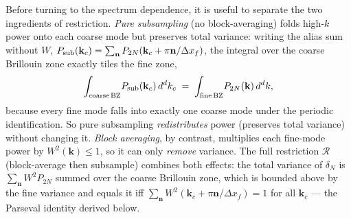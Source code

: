 \documentclass[12pt]{article}
\newcommand{\R}{\mathcal{R}}
\begin{document}
Before turning to the spectrum dependence, it is useful to separate
the two ingredients of restriction. \emph{Pure subsampling} (no
block-averaging) folds high-$k$ power onto each coarse mode but
preserves total variance: writing the alias sum without $W$,
$P_{\rm sub}(\mathbf k_c) = \sum_{\mathbf n}P_{2N}(\mathbf k_c+\pi
\mathbf n/\Delta x_f)$, the integral over the coarse Brillouin zone
exactly tiles the fine zone,
\[
  \int_{\rm coarse\,BZ}\!P_{\rm sub}(\mathbf k_c)\,d^d k_c
  \;=\; \int_{\rm fine\,BZ}\!P_{2N}(\mathbf k)\,d^d k,
\]
because every fine mode falls into exactly one coarse mode under the
periodic identification. So pure subsampling \emph{redistributes}
power (preserves total variance) without changing it. \emph{Block
averaging}, by contrast, multiplies each fine-mode power by
$W^2(\mathbf k)\le 1$, so it can only \emph{remove} variance. The
full restriction $\R$ (block-average then subsample) combines both
effects: the total variance of $\delta_N$ is
$\sum_{\mathbf n}W^2 P_{2N}$ summed over the coarse Brillouin zone,
which is bounded above by the fine variance and equals it iff
$\sum_{\mathbf n}W^2(\mathbf k_c+\pi\mathbf n/\Delta x_f)=1$ for all
$\mathbf k_c$ --- the Parseval identity derived below.
\end{document}
